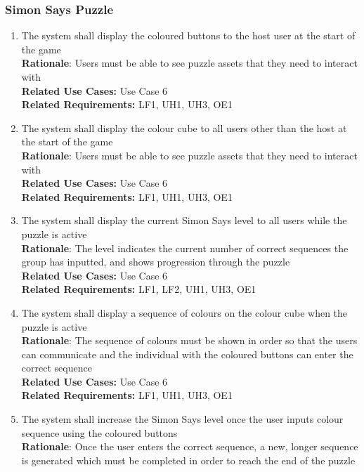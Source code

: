 \documentclass[12pt]{article}
\begin{document}
\subsubsection{Simon Says Puzzle}
    \begin{enumerate}[label=SS\arabic*., series=SimonSays]
        \item The system shall display the coloured buttons to the host user at the start of the game\\
        \textbf{Rationale}: Users must be able to see puzzle assets that they need to interact with\\
        \textbf{Related Use Cases:} Use Case 6\\
        \textbf{Related Requirements:} LF1, UH1, UH3, OE1
        \item The system shall display the colour cube to all users other than the host at the start of the game\\
        \textbf{Rationale}: Users must be able to see puzzle assets that they need to interact with\\
        \textbf{Related Use Cases:} Use Case 6\\
        \textbf{Related Requirements:} LF1, UH1, UH3, OE1
        \item The system shall display the current Simon Says level to all users while the puzzle is active\\
        \textbf{Rationale}: The level indicates the current number of correct sequences the group has inputted, and shows progression through the puzzle\\
        \textbf{Related Use Cases:} Use Case 6\\
        \textbf{Related Requirements:} LF1, LF2, UH1, UH3, OE1
        \item The system shall display a sequence of colours on the colour cube when the puzzle is active\\
        \textbf{Rationale}: The sequence of colours must be shown in order so that the users can communicate and the individual with the coloured buttons can enter the correct sequence\\
        \textbf{Related Use Cases:} Use Case 6\\
        \textbf{Related Requirements:} LF1, UH1, UH3, OE1
        \item The system shall increase the Simon Says level once the user inputs colour sequence using the coloured buttons\\
        \textbf{Rationale}: Once the user enters the correct sequence, a new, longer sequence is generated which must be completed in order to reach the end of the puzzle\\

\end{enumerate}
\end{document}
